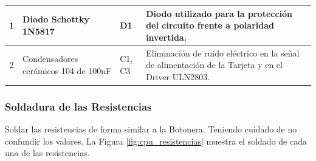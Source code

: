 \documentclass{article}
\begin{document}
\begin{longtable}{|c|>{\raggedright}m{}|>{\centering}m{}|m{}|}
    \\ \hline
    1 & Diodo Schottky 1N5817 & D1 & Diodo utilizado para la protección del circuito frente a polaridad invertida.
    \\ \hline
    2 & Condensadores cerámicos 104 de 100nF & C1, C3 & Eliminación de ruido eléctrico en la señal de alimentación de la Tarjeta y en el Driver ULN2803.
    \\ \hline
\end{longtable}

\subsubsection{Soldadura de las Resistencias}
Soldar las resistencias de forma similar a la Botonera. Teniendo cuidado de no confundir los valores. La Figura \ref{fig:cpu_resistencias} muestra el soldado de cada una de las resistencias.
\end{document}
